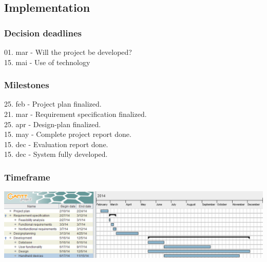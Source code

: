 \subsection{Implementation}
\subsubsection{Decision deadlines}
01. mar - Will the project be developed?\\
15. mai - Use of technology

\subsubsection{Milestones}
25. feb - Project plan finalized.\\
21. mar - Requirement specification finalized.\\
25. apr - Design-plan finalized.\\
15. may - Complete project report done.\\
15. dec - Evaluation report done.\\
15. dec - System fully developed.\\


\subsubsection{Timeframe}

\hspace*{-1.2in}
\includegraphics[scale=0.75]{graphics/gantt}
